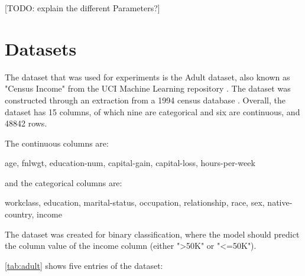 [TODO: explain the different Parameters?]


\section{Datasets}
\label{ch:methods-datasets}

The dataset that was used for experiments is the Adult dataset, also known as "Census Income" from the UCI Machine Learning repository \cite{Dua:2019}.
The dataset was constructed through an extraction from a 1994 census database \cite{kohavi1996ScalingAccuracyNaiveBayes}.
Overall, the dataset has 15 columns, of which nine are categorical and six are continuous, and 48842 rows.

The continuous columns are:

age, fnlwgt, education-num, capital-gain, capital-loss, hours-per-week

and the categorical columns are:

workclass, education, marital-status, occupation, relationship, race, sex, native-country, income

The dataset was created for binary classification, where the model should predict the column value of the income column (either ">50K" or "<=50K").

\autoref{tab:adult} shows five entries of the dataset:


